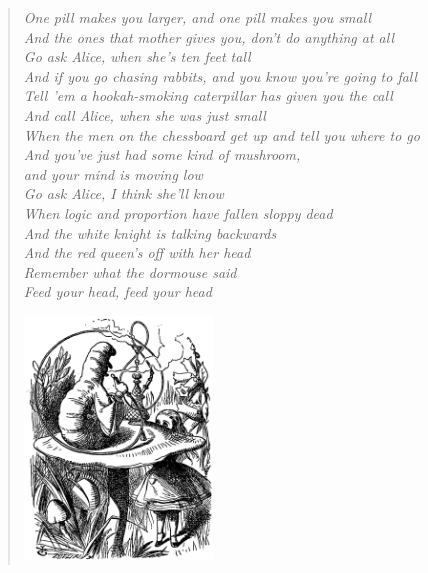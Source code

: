 \documentclass[a4paper, oneside, british, intoc, bibliograph=totoc, index=totoc, BCOR10mm, twoside, openright]{book}
\numberwithin{equation}{section}
\numberwithin{figure}{section}
\begin{document}
\begin{quotation}
\begin{flushright}
\textit{
One pill makes you larger, and one pill makes you small\\
And the ones that mother gives you, don't do anything at all\\
Go ask Alice, when she's ten feet tall\\[1PC]
And if you go chasing rabbits, and you know you're going to fall\\
Tell 'em a hookah-smoking caterpillar has given you the call\\
And call Alice, when she was just small\\[1PC]
When the men on the chessboard get up and tell you where to go\\
And you've just had some kind of mushroom, \\and your mind is moving low\\
Go ask Alice, I think she'll know\\[1PC]
When logic and proportion have fallen sloppy dead\\
And the white knight is talking backwards\\
And the red queen's off with her head\\
Remember what the dormouse said\\[1PC]
Feed your head, feed your head\\[3PC]
}



\includegraphics[width=5cm, keepaspectratio, right]{img/alice1.jpg}

\par\end{flushright}
\end{quotation}
\end{document}
